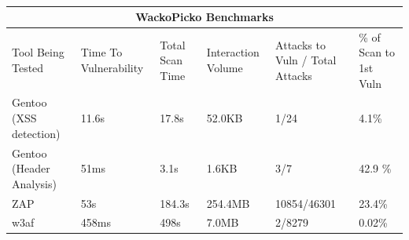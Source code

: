 \begin{table}[h]
	
	{
		\captionsetup{justification=centering}		
		\caption{}
		\label{table:wackopicko_benchmarks}
		\begin{tabular}{ |p{4cm}||p{1.4cm}|p{1.4cm}|p{1.6cm}|p{2cm}|p{2cm}| }
			\hline
			\multicolumn{6}{|c|}{\textbf{WackoPicko Benchmarks}} \\ [0.5ex]
			\hline \hline 
			Tool Being Tested& Time To Vulnerability & Total Scan Time & Interaction Volume & Attacks to Vuln / Total Attacks & \% of Scan to 1st Vuln \\
			\hline
			Gentoo (XSS detection)    &   11.6s   &  17.8s   &  52.0KB           & 1/24 & 4.1\% \\
			Gentoo (Header Analysis) &  51ms &  3.1s  &  1.6KB  & 3/7 & 42.9 \%\\
			ZAP                                   & 53s &  184.3s   & 254.4MB & 10854/46301 & 23.4\%\\ 
			w3af                                 & 458ms & 498s & 7.0MB & 2/8279 & 0.02\% \\
			\hline
		\end{tabular}
	} \\
\end{table}


